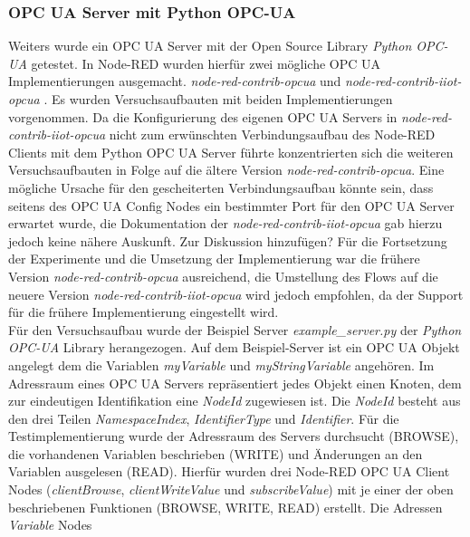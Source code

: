 \documentclass[BMR,Bachelor,ngerman]{twbook}%
\begin{document}
\subsubsection{OPC UA Server mit Python OPC-UA}
Weiters wurde ein OPC UA Server mit der Open Source Library \emph{Python OPC-UA} \cite{pythonopcua2018} getestet. In Node-RED wurden hierfür zwei mögliche \ac{OPC UA} Implementierungen ausgemacht. \emph{node-red-contrib-opcua} \cite{node-red-opcua} und \emph{node-red-contrib-iiot-opcua} \cite{node-red-iiot-opcua}. Es wurden Versuchsaufbauten mit beiden Implementierungen vorgenommen. Da die Konfigurierung des eigenen \ac{OPC UA} Servers in \emph{node-red-contrib-iiot-opcua} nicht zum erwünschten Verbindungsaufbau des Node-RED Clients mit dem Python OPC UA Server führte konzentrierten sich die weiteren Versuchsaufbauten in Folge auf die ältere Version \emph{node-red-contrib-opcua}. Eine mögliche Ursache für den gescheiterten Verbindungsaufbau könnte sein, dass seitens des OPC UA Config Nodes ein bestimmter Port für den OPC UA Server erwartet wurde, die Dokumentation der \emph{node-red-contrib-iiot-opcua} gab hierzu jedoch keine nähere Auskunft. {\color{purple}Zur Diskussion hinzufügen? Für die Fortsetzung der Experimente und die Umsetzung der Implementierung war die frühere Version \emph{node-red-contrib-opcua} ausreichend, die Umstellung des Flows auf die neuere Version \emph{node-red-contrib-iiot-opcua} wird jedoch empfohlen, da der Support für die frühere Implementierung eingestellt wird.}
%
\\\newline Für den Versuchsaufbau wurde der Beispiel Server \emph{example\_server.py} der \emph{Python OPC-UA} Library herangezogen. Auf dem Beispiel-Server ist ein \ac{OPC UA} Objekt angelegt dem die Variablen \emph{myVariable} und \emph{myStringVariable} angehören. Im Adressraum eines \ac{OPC UA} Servers repräsentiert jedes Objekt einen Knoten, dem zur eindeutigen Identifikation eine \emph{NodeId} zugewiesen ist. Die \emph{NodeId} besteht aus den drei Teilen \emph{NamespaceIndex}, \emph{IdentifierType} und \emph{Identifier}. 
Für die Testimplementierung wurde der Adressraum des Servers durchsucht (BROWSE), die vorhandenen Variablen beschrieben (WRITE) und Änderungen an den Variablen ausgelesen (READ). Hierfür wurden drei Node-RED \ac{OPC UA} Client Nodes (\emph{clientBrowse}, \emph{clientWriteValue} und \emph{subscribeValue}) mit je einer der oben beschriebenen Funktionen (BROWSE, WRITE, READ) erstellt. Die Adressen \emph{Variable} Nodes
\end{document}
